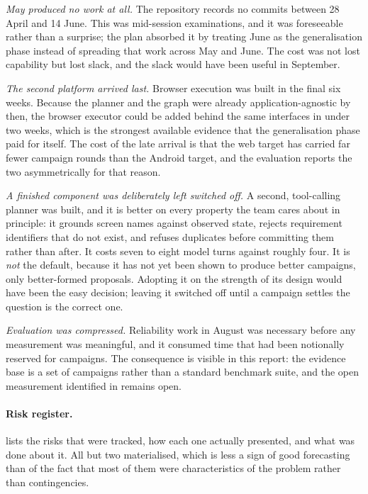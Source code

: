 \emph{May produced no work at all.} The repository records no commits between
28 April and 14 June. This was mid-session examinations, and it was foreseeable
rather than a surprise; the plan absorbed it by treating June as the
generalisation phase instead of spreading that work across May and June. The
cost was not lost capability but lost slack, and the slack would have been
useful in September.

\emph{The second platform arrived last.} Browser execution was built in the
final six weeks. Because the planner and the graph were already
application-agnostic by then, the browser executor could be added behind the
same interfaces in under two weeks, which is the strongest available evidence
that the generalisation phase paid for itself. The cost of the late arrival is
that the web target has carried far fewer campaign rounds than the Android
target, and the evaluation reports the two asymmetrically for that reason.

\emph{A finished component was deliberately left switched off.} A second,
tool-calling planner was built, and it is better on every property the team
cares about in principle: it grounds screen names against observed state,
rejects requirement identifiers that do not exist, and refuses duplicates
before committing them rather than after. It costs seven to eight model turns
against roughly four. It is \emph{not} the default, because it has not yet been
shown to produce better campaigns, only better-formed proposals. Adopting it on
the strength of its design would have been the easy decision; leaving it
switched off until a campaign settles the question is the correct one.

\emph{Evaluation was compressed.} Reliability work in August was necessary
before any measurement was meaningful, and it consumed time that had been
notionally reserved for campaigns. The consequence is visible in this report:
the evidence base is a set of campaigns rather than a standard benchmark suite,
and the open measurement identified in  remains open.

\paragraph{Risk register.}  lists the risks that were tracked,
how each one actually presented, and what was done about it. All but two
materialised, which is less a sign of good forecasting than of the fact that
most of them were characteristics of the problem rather than contingencies.

